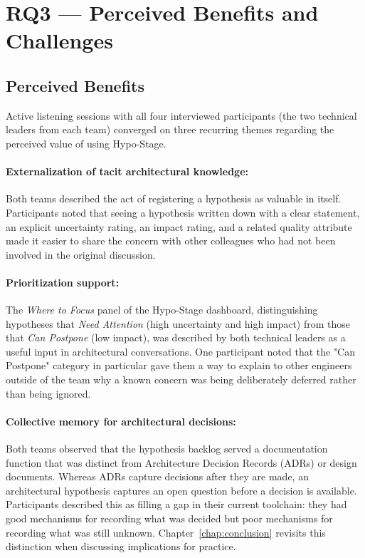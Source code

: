 \section{RQ3 — Perceived Benefits and Challenges}
\label{sec:rq3-results}
\label{sec:results-rq3}

\subsection{Perceived Benefits}
\label{subsec:benefits}

Active listening sessions with all four interviewed participants (the two
technical leaders from each team) converged on three recurring themes regarding
the perceived value of using Hypo-Stage.

\paragraph{Externalization of tacit architectural knowledge:}
Both teams described the act of registering a hypothesis as valuable in itself.
Participants noted that seeing a hypothesis written down with a clear statement,
an explicit uncertainty rating, an impact rating, and a related quality attribute
made it easier to share the concern with other colleagues who had not been involved
in the original discussion.

\paragraph{Prioritization support:}
The \textit{Where to Focus} panel of the Hypo-Stage dashboard, distinguishing
hypotheses that \textit{Need Attention} (high uncertainty and high impact) from
those that \textit{Can Postpone} (low impact), was described by both technical
leaders as a useful input in architectural conversations. One participant noted that
the "Can Postpone" category in particular gave them a way to explain
to other engineers outside of the team why a known concern was being deliberately deferred rather
than being ignored.

\paragraph{Collective memory for architectural decisions:}
Both teams observed that the hypothesis backlog served a documentation function
that was distinct from Architecture Decision Records (ADRs) or design documents.
Whereas ADRs capture decisions after they are made, an architectural hypothesis
captures an open question before a decision is available. Participants described
this as filling a gap in their current toolchain: they had good mechanisms for
recording what was decided but poor mechanisms for recording what was still
unknown.
Chapter~\ref{chap:conclusion} revisits this distinction when discussing implications for practice.

